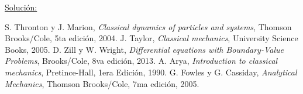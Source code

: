 \documentclass[a4paper,10pt]{article}
\begin{document}
\vspace{.3cm}

\underline{Solución:}

\vspace{.3cm}

\begin{thebibliography}{10}
 S. Thronton y J. Marion, \textit{Classical dynamics of particles and systems}, Thomson Brooks/Cole,
 5ta edición, 2004.
 J. Taylor, \textit{Classical mechanics}, University Science Books, 2005.
 D. Zill y W. Wright, \textit{Differential equations with Boundary-Value Problems}, Brooks/Cole,
 8va edición, 2013.
 A. Arya, \textit{Introduction to classical mechanics}, Pretince-Hall, 1era Edición,
 1990.
 G. Fowles y G. Cassiday, \emph{Analytical Mechanics}, Thomson Brooks/Cole, 
 7ma edición, 2005.
\end{thebibliography}
\end{document}
